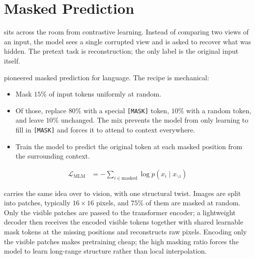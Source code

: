\section{Masked Prediction}


 sits across the room from contrastive learning. Instead of comparing two views of an input, the model sees a single corrupted view and is asked to recover what was hidden. The pretext task is reconstruction; the only label is the original input itself.

\vspace{1.0em}
\cite{Devlin2019BERT} pioneered masked prediction for language. The recipe is mechanical:
\begin{itemize}
    \item Mask $15\%$ of input tokens uniformly at random.
    \item Of those, replace $80\%$ with a special \texttt{[MASK]} token, $10\%$ with a random token, and leave $10\%$ unchanged. The mix prevents the model from only learning to fill in \texttt{[MASK]} and forces it to attend to context everywhere.
    \item Train the model to predict the original token at each masked position from the surrounding context.
\end{itemize}

\begin{align*}
    \mathcal{L}_{\text{MLM}} &= -\sum_{i \in \text{masked}} \log p(x_i \mid x_{\backslash i})
\end{align*}

\vspace{1.0em}
\cite{He2022MAE} carries the same idea over to vision, with one structural twist. Images are split into patches, typically $16{\times}16$ pixels, and $75\%$ of them are masked at random. Only the visible patches are passed to the transformer encoder; a lightweight decoder then receives the encoded visible tokens together with shared learnable mask tokens at the missing positions and reconstructs raw pixels. Encoding only the visible patches makes pretraining cheap; the high masking ratio forces the model to learn long-range structure rather than local interpolation.


